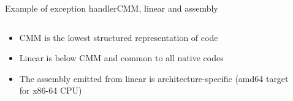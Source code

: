 \begin{frame}{Example of exception handler}{CMM, linear and assembly}
\begin{columns}[c]
\begin{column}{0.6\textwidth}
\begin{itemize}
\item CMM is the lowest structured representation of code
\item Linear is below CMM and common to all native codes
\item The assembly emitted from linear is architecture-specific (amd64 target for x86-64 CPU)
\end{itemize}
\end{column}
\begin{column}{0.4\textwidth}
\end{column}
\end{columns}
\end{frame}

